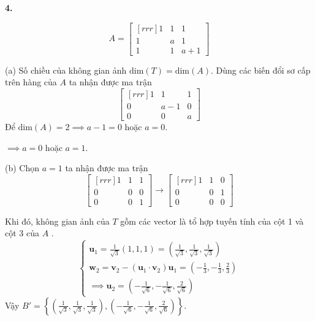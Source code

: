\documentclass{article}
\newcommand\ddfrac[2]{\frac{\displaystyle #1}{\displaystyle #2}}
\begin{document}
    \begin{minipage}[t]{0.45\linewidth}
    \textbf{4.} 

    \[A = \begin{bmatrix}[rrr]
        1 & 1 & 1 \\
        1 & a & 1 \\
        1 & 1 & a+1 
    \end{bmatrix} \]

    (a) Số chiều của không gian ảnh $\text{dim}(T) = \text{dim}(A)$.
    Dùng các biến đổi sơ cấp trên hàng của $A$ ta nhận được ma trận
    \[ \begin{bmatrix}[rrr]
        1 & 1 & 1 \\
        0 & a-1 & 0 \\
        0 & 0 & a 
    \end{bmatrix} \]
    Để $\text{dim}(A)=2 \implies a - 1 = 0$ hoặc $a = 0$.

    $\implies a = 0$ hoặc $a = 1$.

    (b) Chọn $a = 1$ ta nhận được ma trận 
    \[ \begin{bmatrix}[rrr]
        1 & 1 & 1 \\
        0 & 0 & 0 \\
        0 & 0 & 1 
    \end{bmatrix} \to \begin{bmatrix}[rrr]
        1 & 1 & 0 \\
        0 & 0 & 1 \\
        0 & 0 & 0 
    \end{bmatrix} \]

    Khi đó, không gian ảnh của $T$ gồm các vector là tổ hợp tuyến tính của cột 1 và cột 3 của $A$  .
    \[\begin{cases}{}
        \textbf{u}_1 = \ddfrac{1}{\sqrt{3}} (1,1,1) = \left( \ddfrac{1}{\sqrt{3}} , \ddfrac{1}{\sqrt{3}} , \ddfrac{1}{\sqrt{3}}  \right) \\
        \textbf{w} _2 = \textbf{v}_2 - ( \textbf{u}_1 \cdot \textbf{v}_2 ) \textbf{u}_1 = \left( - \ddfrac{1}{3} , - \ddfrac{1}{3} , \ddfrac{2}{3}  \right)\\ \implies \textbf{u}_2 = \left( - \ddfrac{1}{\sqrt{6}} , - \ddfrac{1}{\sqrt{6}} , \ddfrac{2}{\sqrt{6}}  \right)
    \end{cases} \]
    Vậy $B' = \left\{ \left( \ddfrac{1}{\sqrt{3}} , \ddfrac{1}{\sqrt{3}} , \ddfrac{1}{\sqrt{3}}  \right) , \left( - \ddfrac{1}{\sqrt{6}} , - \ddfrac{1}{\sqrt{6}} , \ddfrac{2}{\sqrt{6}}  \right) \right\} $.
    
        
    \end{minipage} \hfill
\end{document}
